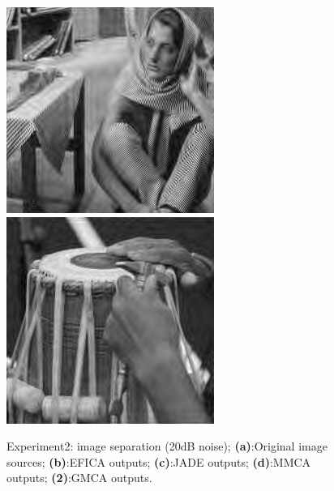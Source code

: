\begin{figure}[!htbp]
{\begin{minipage}[b]{0.17\linewidth}
\includegraphics[width=1\linewidth]{images/gmca_out3.png}\vspace{4pt}
\includegraphics[width=1\linewidth]{images/gmca_out4.png}
\end{minipage}}
\caption{Experiment2: image separation (20dB noise); \textbf{(a)}:Original image sources; \textbf{(b)}:EFICA outputs; \textbf{(c)}:JADE outputs; \textbf{(d)}:MMCA outputs; \textbf{(2)}:GMCA outputs.}
\label{BSS_ex2_11}
\end{figure}

